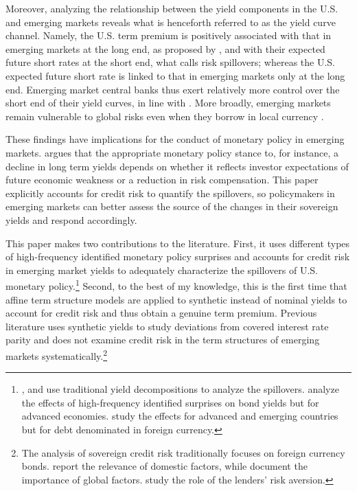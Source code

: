\documentclass[a4paper, 12pt]{article}
\begin{document}
Moreover, analyzing the relationship between the yield components in the U.S. and emerging markets reveals what is henceforth referred to as the yield curve channel. Namely, the U.S. term premium is positively associated with that in emerging markets at the long end, as proposed by \cite{Turner:2014}, and with their expected future short rates at the short end, what \cite{Kalemli-Ozcan:2019} calls risk spillovers; whereas the U.S. expected future short rate is linked to that in emerging markets only at the long end. Emerging market central banks thus exert relatively more control over the short end of their yield curves, in line with \cite{Obstfeld:2015}. More broadly, emerging markets remain vulnerable to global risks even when they borrow in local currency \citep{CarstensShin:2019}. 

These findings have implications for the conduct of monetary policy in emerging markets. \cite{Bernanke:2006} argues that the appropriate monetary policy stance to, for instance, a decline in long term yields depends on whether it reflects investor expectations of future economic weakness or a reduction in risk compensation. This paper explicitly accounts for credit risk to quantify the spillovers, so policymakers  in emerging markets can better assess the source of the changes in their sovereign yields and respond accordingly. 

This paper makes two contributions to the literature. First, it uses different types of high-frequency identified monetary policy surprises and accounts for credit risk in emerging market yields to adequately characterize the spillovers of U.S. monetary policy.\footnote{ \cite{CurcuruKaminLiRodriguez:2018}, \cite{ACDM:2019} and \cite{Albaglietal:2019} use traditional yield decompositions to analyze the spillovers. \cite{RogersScottiWright:2014,RogersScottiWright:2018} analyze the effects of high-frequency identified surprises on bond yields but for advanced economies. \cite{GilchristYueZakrajsek:2019} study the effects for advanced and emerging countries but for debt denominated in foreign currency.} Second, to the best of my knowledge, this is the first time that affine term structure models are applied to synthetic instead of nominal yields to account for credit risk and thus obtain a genuine term premium. Previous literature uses synthetic yields to study deviations from covered interest rate parity and does not examine credit risk in the term structures of emerging markets systematically.\footnote{ The analysis of sovereign credit risk traditionally focuses on foreign currency bonds. \cite{HilscherNosbusch:2010} report the relevance of domestic factors, while \cite{Longstaffetal:2011} document the importance of global factors. \cite{BorriVerdelhan:2012} study the role of the lenders' risk aversion.} 
\end{document}
